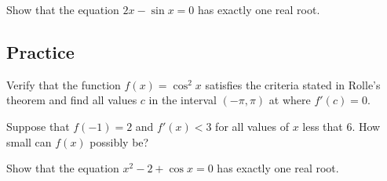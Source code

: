 \begin{example}

Show that the equation \(2x-\sin x=0\) has exactly one real root.

\end{example}
\vspace*{6\baselineskip}

\subsection{Practice}

\begin{exercise}

Verify that the function \(f(x)=\cos^2x\) satisfies the criteria stated
in Rolle's theorem and find all values \(c\) in the interval
\((-\pi, \pi)\) at where \(f'(c)=0\).

\end{exercise}
\vspace*{6\baselineskip}

\begin{exercise}

Suppose that \(f(-1)=2\) and \(f'(x)<3\) for all values of \(x\) less
that 6. How small can \(f(x)\) possibly be?

\end{exercise}
\vspace*{6\baselineskip}

\begin{exercise}

Show that the equation \(x^2-2+\cos x=0\) has exactly one real root.

\end{exercise}

